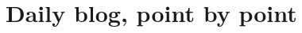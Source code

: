 \documentclass[aip,cha,reprint,
secnumarabic,
nofootinbib, tightenlines,
nobibnotes, showkeys, showpacs,
groupedaddress
]{revtex4-1}
\begin{document}



\ifdraft
    \onecolumngrid

    \newpage

    \newpage

    \newpage
    \section{Daily blog, point by point}
    \label{chap:atlas}

\fi
\end{document}
